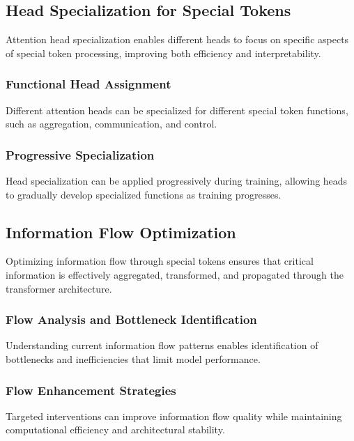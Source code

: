 \subsection{Head Specialization for Special Tokens}

Attention head specialization enables different heads to focus on specific aspects of special token processing, improving both efficiency and interpretability.

\subsubsection{Functional Head Assignment}

Different attention heads can be specialized for different special token functions, such as aggregation, communication, and control.

\subsubsection{Progressive Specialization}

Head specialization can be applied progressively during training, allowing heads to gradually develop specialized functions as training progresses.

\subsection{Information Flow Optimization}

Optimizing information flow through special tokens ensures that critical information is effectively aggregated, transformed, and propagated through the transformer architecture.

\subsubsection{Flow Analysis and Bottleneck Identification}

Understanding current information flow patterns enables identification of bottlenecks and inefficiencies that limit model performance.

\subsubsection{Flow Enhancement Strategies}

Targeted interventions can improve information flow quality while maintaining computational efficiency and architectural stability.